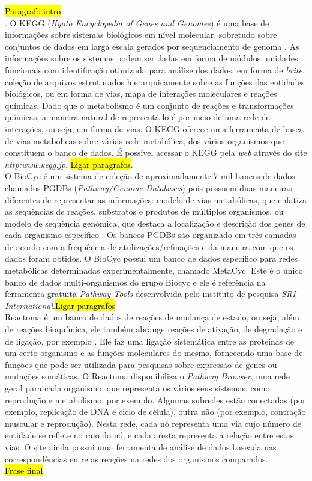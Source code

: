 \documentclass[conference]{IEEEtran}
\begin{document}
\hl{Paragrafo intro}  \\. O KEGG (\textit{Kyoto Encyclopedia of Genes and Genomes}) é uma base de informações sobre sistemas biológicos em nível molecular, sobretudo sobre conjuntos de dados em larga escala gerados por sequenciamento de genoma \cite{keggOverview}. As informações sobre os sistemas podem ser dadas em forma de módulos, unidades funcionais com identificação otimizada para análise dos dados, em forma de \textit{brite}, coleção de arquivos estruturados hierarquicamente sobre as funções das entidades biológicos, ou em forma de vias, mapa de interações moleculares e reações químicas. Dado que o metabolismo é um conjunto de reações e transformações químicas, a maneira natural de representá-lo é por meio de uma rede de interações, ou seja, em forma de vias. O KEGG oferece uma ferramenta de busca de vias metabólicas sobre várias rede metabólica, dos vários organismos que constituem o banco de dados. É possível acessar o KEGG pela \textit{web} através do site \textit{http:\/\/www.kegg.jp\/}. \hl{Ligar paragrafos}.\\
\indent O BioCyc é um sistema de coleção de aproximadamente 7 mil bancos de dados chamados PGDBs (\textit{Pathway/Genome Databases}) pois possuem duas maneiras diferentes de representar as informações: modelo de vias metabólicas, que enfatiza as sequências de reações, substratos e produtos de múltiplos organismos, ou modelo de sequência genômica, que destaca a localização e descrição dos genes de cada organismo específico \cite{biocycIntro}. Os bancos PGDBs são organizado em três camadas de acordo com a frequência de atulizações/refinações e da maneira com que os dados foram obtidos. O BioCyc possui um banco de dados específico para redes metabólicas determinadas experimentalmente, chamado MetaCyc. Este é o único banco de dados multi-organismos do grupo Biocyc e ele é referência na ferramenta gratuita \textit{Pathway Tools} desenvolvida pelo instituto de pesquisa \textit{SRI International}.\hl{Ligar paragrafos} \\
\indent Reactoma é um banco de dados de reações de mudança de estado, ou seja, além de reações bioquímica, ele também abrange reações de ativação, de degradação e de ligação, por exemplo \cite{reactomeUsersguide}. Ele faz uma ligação sistemática entre as proteínas de um certo organismo e as funções moleculares do mesmo, fornecendo uma base de funções que pode ser utilizada para pesquisas sobre expressão de genes ou mutações somáticas. O Reactoma disponibiliza o \textit{Pathway Browser}, uma rede geral para cada organismo, que representa os vários seus sistemas, como reprodução e metabolismo, por exemplo. Algumas subredes estão conectadas (por exemplo, replicação de DNA e ciclo de célula), outra não (por exemplo, contração muscular e reprodução). Nesta rede, cada nó representa uma via cujo número de entidade se reflete no raio do nó, e cada aresta representa a relação entre estas vias. O site ainda possui uma ferramenta de análise de dados baseada nas correspondências entre as reações na redes dos organismos comparados. \\
\hl{Frase final} \\
\end{document}
